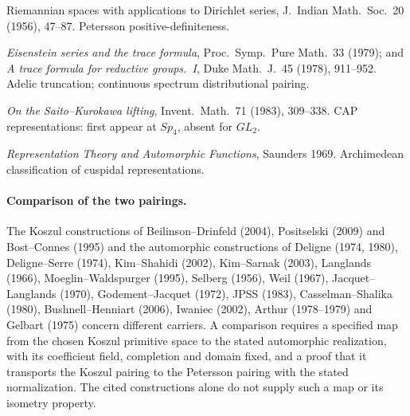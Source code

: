 \begin{description}
{Riemannian spaces with applications to Dirichlet series}, J.~Indian
Math.~Soc.~20 (1956), 47--87. Petersson positive-definiteness.
\item[Arthur, J.]
\emph{Eisenstein series and the trace formula}, Proc.~Symp.~Pure
Math.~33 (1979); and \emph{A trace formula for reductive groups.~I},
Duke Math.~J.~45 (1978), 911--952. Adelic truncation; continuous
spectrum distributional pairing.
\item[Piatetski-Shapiro, I.]
\emph{On the Saito--Kurokawa lifting}, Invent.~Math.~71 (1983),
309--338. CAP representations: first appear at \(Sp_{4}\), absent for
\(GL_{2}\).
\item[Gelfand, I. M., Graev, M. I., and Piatetski-Shapiro, I. I.]
\emph{Representation Theory and Automorphic Functions}, Saunders
1969. Archimedean classification of cuspidal representations.
\end{description}

\paragraph{Comparison of the two pairings.}
The Koszul constructions of Beilinson--Drinfeld (2004),
Positselski (2009) and Bost--Connes (1995) and the automorphic
constructions of Deligne (1974, 1980), Deligne--Serre (1974),
Kim--Shahidi (2002), Kim--Sarnak (2003), Langlands (1966),
Moeglin--Waldspurger (1995), Selberg (1956), Weil (1967),
Jacquet--Langlands (1970), Godement--Jacquet (1972), JPSS (1983),
Casselman--Shalika (1980), Bushnell--Henniart (2006), Iwaniec (2002),
Arthur (1978--1979) and Gelbart (1975) concern different carriers.
A comparison requires a specified map from the chosen Koszul
primitive space to the stated automorphic realization, with its
coefficient field, completion and domain fixed, and a proof that
it transports the Koszul pairing to the Petersson pairing with
the stated normalization. The cited constructions alone do not
supply such a map or its isometry property.
